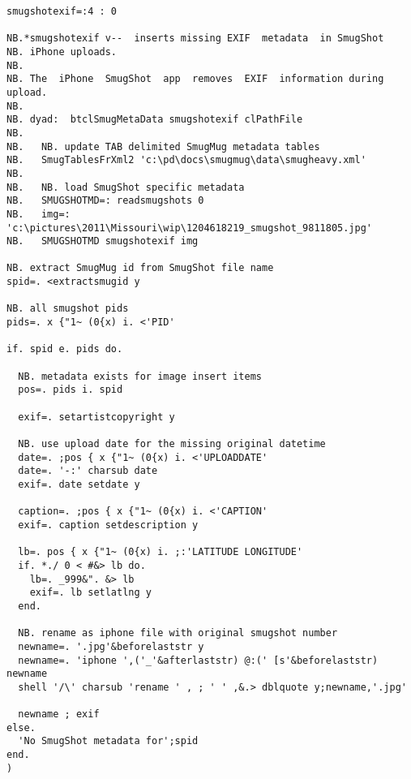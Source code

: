 \begin{tcolorbox}[breakable, size=fbox, boxrule=1pt, pad at break*=1mm,colback=cellbackground, colframe=cellborder]
\begin{lstlisting}[language=jdoc, frame=single,framerule=0pt,label=lst:scr1258X0]
smugshotexif=:4 : 0

NB.*smugshotexif v--  inserts missing EXIF  metadata  in SmugShot
NB. iPhone uploads.
NB.
NB. The  iPhone  SmugShot  app  removes  EXIF  information during upload.
NB.
NB. dyad:  btclSmugMetaData smugshotexif clPathFile
NB.
NB.   NB. update TAB delimited SmugMug metadata tables
NB.   SmugTablesFrXml2 'c:\pd\docs\smugmug\data\smugheavy.xml'
NB.
NB.   NB. load SmugShot specific metadata
NB.   SMUGSHOTMD=: readsmugshots 0
NB.   img=: 'c:\pictures\2011\Missouri\wip\1204618219_smugshot_9811805.jpg'
NB.   SMUGSHOTMD smugshotexif img

NB. extract SmugMug id from SmugShot file name
spid=. <extractsmugid y

NB. all smugshot pids
pids=. x {"1~ (0{x) i. <'PID'

if. spid e. pids do.

  NB. metadata exists for image insert items
  pos=. pids i. spid

  exif=. setartistcopyright y

  NB. use upload date for the missing original datetime
  date=. ;pos { x {"1~ (0{x) i. <'UPLOADDATE'
  date=. '-:' charsub date
  exif=. date setdate y

  caption=. ;pos { x {"1~ (0{x) i. <'CAPTION'
  exif=. caption setdescription y

  lb=. pos { x {"1~ (0{x) i. ;:'LATITUDE LONGITUDE'
  if. *./ 0 < #&> lb do.
    lb=. _999&". &> lb
    exif=. lb setlatlng y
  end.

  NB. rename as iphone file with original smugshot number
  newname=. '.jpg'&beforelaststr y
  newname=. 'iphone ',('_'&afterlaststr) @:(' [s'&beforelaststr) newname
  shell '/\' charsub 'rename ' , ; ' ' ,&.> dblquote y;newname,'.jpg'

  newname ; exif
else.
  'No SmugShot metadata for';spid
end.
)
\end{lstlisting}
\end{tcolorbox}


%